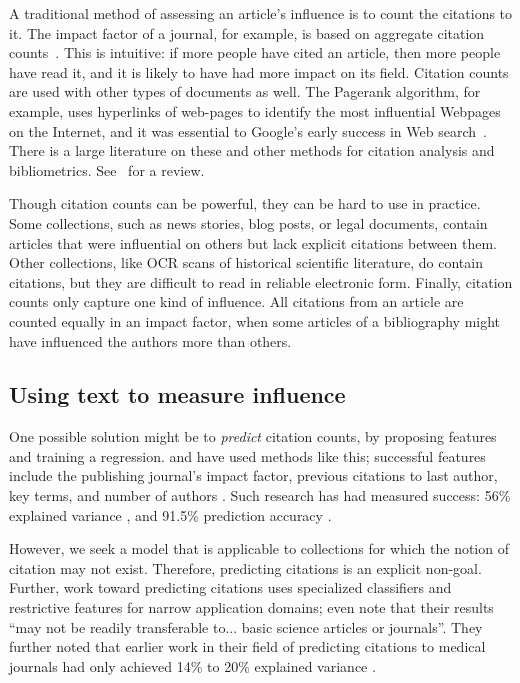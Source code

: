 A traditional method of assessing an article's influence is to count
the citations to it. The impact factor of a journal, for example, is
based on aggregate citation counts~\citep{garfield:2002}.  This is
intuitive: if more people have cited an article, then more people have
read it, and it is likely to have had more impact on its field.
Citation counts are used with other types of documents as well.  The
Pagerank algorithm, for example, uses hyperlinks of web-pages to
identify the most influential Webpages on the Internet, and it was
essential to Google's early success in Web search~\citep{brin:1998}.
There is a large literature on these and other methods for citation
analysis and bibliometrics.  See~\citep{osareh:1996} for a review.

Though citation counts can be powerful, they can be hard to use in
practice.  Some collections, such as news stories, blog posts, or
legal documents, contain articles that were influential on others but
lack explicit citations between them.  Other collections, like OCR
scans of historical scientific literature, do contain citations, but
they are difficult to read in reliable electronic form.  Finally,
citation counts only capture one kind of influence.  All citations
from an article are counted equally in an impact factor, when some
articles of a bibliography might have influenced the authors more than
others.

\subsection*{Using text to measure influence}

One possible solution might be to \emph{predict} citation counts, by
proposing features and training a regression. \cite{tang:2009} and
\cite{lokker:2008} have used methods like this; successful features include
the publishing journal's impact factor, previous citations to last
author, key terms, and number of authors
\citep{tang:2009,lokker:2008}.  Such research has had measured
success: 56\% explained variance \citep{lokker:2008}, and 91.5\%
prediction accuracy \citep{ibanez:2009}.

However, we seek a model that is applicable to collections for which
the notion of citation may not exist.  Therefore, predicting citations
is an explicit non-goal.  Further, work toward predicting citations
uses specialized classifiers and restrictive features for narrow
application domains; \cite{lokker:2008} even note that their results
``may not be readily transferable to... basic science articles or
journals''. They further noted that earlier work in their field of
predicting citations to medical journals had only achieved 14\% to
20\% explained variance \citep{lokker:2008}.

